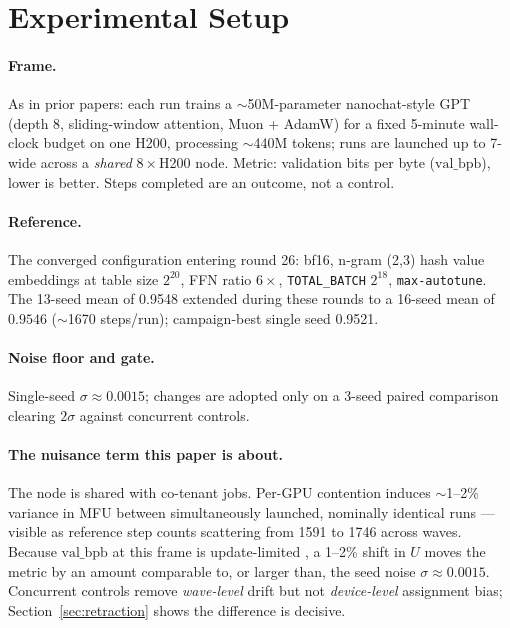 \documentclass{article}
\newcommand{\valbpb}{\mathrm{val\_bpb}}
\begin{document}
\section{Experimental Setup}
\label{sec:setup}

\paragraph{Frame.} As in prior papers: each run trains a $\sim$50M-parameter nanochat-style GPT \cite{karpathy2025nanochat} (depth 8, sliding-window attention, Muon \cite{jordan2024muon} + AdamW) for a fixed 5-minute wall-clock budget on one H200, processing $\sim$440M tokens; runs are launched up to 7-wide across a \emph{shared} $8\times$H200 node. Metric: validation bits per byte ($\valbpb$), lower is better. Steps completed are an outcome, not a control.

\paragraph{Reference.} The converged configuration entering round 26: bf16, n-gram (2,3) hash value embeddings at table size $2^{20}$, FFN ratio $6\times$, \texttt{TOTAL\_BATCH} $2^{18}$, \texttt{max-autotune}. The 13-seed mean of 0.9548 extended during these rounds to a 16-seed mean of $0.9546$ ($\sim$1670 steps/run); campaign-best single seed 0.9521.

\paragraph{Noise floor and gate.} Single-seed $\sigma \approx 0.0015$; changes are adopted only on a 3-seed paired comparison clearing $2\sigma$ against concurrent controls.

\paragraph{The nuisance term this paper is about.} The node is shared with co-tenant jobs. Per-GPU contention induces $\sim$1--2\% variance in MFU between simultaneously launched, nominally identical runs --- visible as reference step counts scattering from 1591 to 1746 across waves. Because $\valbpb$ at this frame is update-limited \cite{ophis2026capstone}, a 1--2\% shift in $U$ moves the metric by an amount comparable to, or larger than, the seed noise $\sigma \approx 0.0015$. Concurrent controls remove \emph{wave-level} drift but not \emph{device-level} assignment bias; Section~\ref{sec:retraction} shows the difference is decisive.
\end{document}
